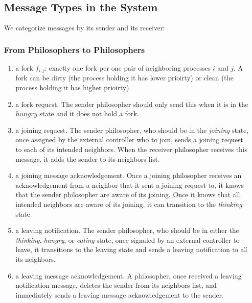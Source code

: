\documentclass[11pt]{article}
\begin{document}
\subsection{Message Types in the System}
We categorize messages by its sender and its receiver:
\subsubsection{From Philosophers to Philosophers}
\begin{enumerate}[M1]
\item \label{M:fork} a fork $f_{i,j}$: exactly one fork per one pair of neighboring processes $i$ and $j$. A fork can be dirty (the process holding it has lower prioirty) or clean (the process holding it has higher prioirty).
\item \label{M:fork_request} a fork request. The sender philosopher should only send this when it is in the $hungry$ state and it does not hold a fork.
\item \label{M:joining_request} a joining request. The sender philosopher, who should be in the \textit{joining} state, once assigned by the external controller who to join, sends a joining request to each of its intended neighbors. When the receiver philosopher receives this message, it adds the sender to its neighbors list.
\item \label{M:joining_ack} a joining message acknowledgement. Once a joining philosopher receives an acknowledgement from a neighbor that it sent a joining request to, it knows that the sender philosopher are aware of its joining. Once it knows that all intended neighbors are aware of its joining, it can transition to the \emph{thinking} state.
\item \label{M:leaving_notification} a leaving notification. The sender philosopher, who should be in either the \textit{thinking}, \textit{hungry}, or \textit{eating} state, once signaled by an external controller to leave, it transitions to the leaving state and sends a leaving notification to all its neighbors.
\item \label{M:leaving_ack} a leaving message acknowledgement. A philosopher, once received a leaving notification message, deletes the sender from its neighbors list, and immediately sends a leaving message acknowledgement to the sender.
\end{enumerate}
\end{document}
